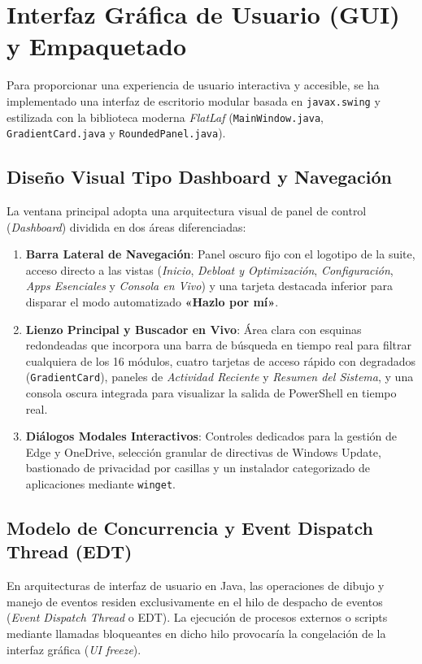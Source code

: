 \documentclass[12pt,a4paper]{report}
\begin{document}
\section[Interfaz Gráfica de Usuario]{Interfaz Gráfica de Usuario (GUI) y Empaquetado}
Para proporcionar una experiencia de usuario interactiva y accesible, se ha implementado una interfaz de escritorio modular basada en \texttt{javax.swing} y estilizada con la biblioteca moderna \textit{FlatLaf} (\texttt{MainWindow.java}, \texttt{GradientCard.java} y \texttt{RoundedPanel.java}).

\subsection{Diseño Visual Tipo Dashboard y Navegación}
La ventana principal adopta una arquitectura visual de panel de control (\textit{Dashboard}) dividida en dos áreas diferenciadas:
\begin{enumerate}
    \item \textbf{Barra Lateral de Navegación}: Panel oscuro fijo con el logotipo de la suite, acceso directo a las vistas (\textit{Inicio}, \textit{Debloat y Optimización}, \textit{Configuración}, \textit{Apps Esenciales} y \textit{Consola en Vivo}) y una tarjeta destacada inferior para disparar el modo automatizado \textbf{«Hazlo por mí»}.
    \item \textbf{Lienzo Principal y Buscador en Vivo}: Área clara con esquinas redondeadas que incorpora una barra de búsqueda en tiempo real para filtrar cualquiera de los 16 módulos, cuatro tarjetas de acceso rápido con degradados (\texttt{GradientCard}), paneles de \textit{Actividad Reciente} y \textit{Resumen del Sistema}, y una consola oscura integrada para visualizar la salida de PowerShell en tiempo real.
    \item \textbf{Diálogos Modales Interactivos}: Controles dedicados para la gestión de Edge y OneDrive, selección granular de directivas de Windows Update, bastionado de privacidad por casillas y un instalador categorizado de aplicaciones mediante \texttt{winget}.
\end{enumerate}

\subsection{Modelo de Concurrencia y Event Dispatch Thread (EDT)}
En arquitecturas de interfaz de usuario en Java, las operaciones de dibujo y manejo de eventos residen exclusivamente en el hilo de despacho de eventos (\textit{Event Dispatch Thread} o EDT). La ejecución de procesos externos o scripts mediante llamadas bloqueantes en dicho hilo provocaría la congelación de la interfaz gráfica (\textit{UI freeze}).
\end{document}
